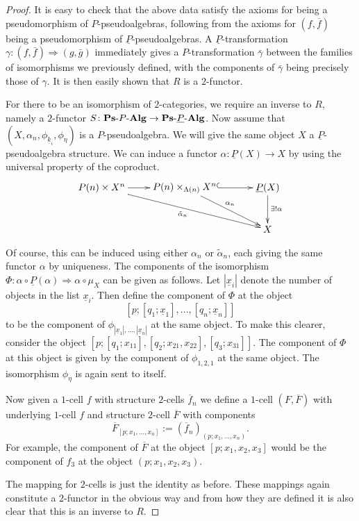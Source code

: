 \begin{proof}
It is easy to check that the above data satisfy the axioms for being a pseudomorphism of $P$-pseudoalgebras, following from the axioms for $(f,\overline{f})$ being a pseudomorphism of $\underline{P}$-pseudoalgebras. A $\underline{P}$-transformation $\gamma \colon (f, \bar{f}) \Rightarrow (g, \bar{g})$ immediately gives a $P$-transformation $\bar{\gamma}$ between the families of isomorphisms we previously defined, with the components of $\bar{\gamma}$ being precisely those of $\gamma$. It is then easily shown that $R$ is a $2$-functor.

For there to be an isomorphism of $2$-categories, we require an inverse to $R$, namely a $2$-functor $S \colon \mathbf{Ps}\mbox{-}P\mbox{-}\mathbf{Alg} \rightarrow \mathbf{Ps}\mbox{-}\underline{P}\mbox{-}\mathbf{Alg}$. Now assume that $(X, \alpha_n, \phi_{\underline{k}_i}, \phi_\eta)$ is a $P$-pseudoalgebra. We will give the same object $X$ a $\underline{P}$-pseudoalgebra structure. We can induce a functor $\alpha \colon \underline{P}(X) \rightarrow X$ by using the universal property of the coproduct.
    \[
        \xy
            (-30,0)*+{P(n) \times X^n}="-10";
            (0,0)*+{P(n) \times_{\Lambda(n)} X^n}="00";
            (30,0)*+{\underline{P}(X)}="10";
            (30,-15)*+{X}="11";
            {\ar "-10" ; "00"};
            {\ar^{\alpha_n} "00" ; "11"};
            {\ar@{^{(}->} "00" ; "10"};
            {\ar^{\exists ! \alpha} "10" ; "11"};
            {\ar_{\tilde{\alpha}_n} "-10" ; "11"};
        \endxy
    \]

Of course, this can be induced using either $\alpha_n$ or $\tilde{\alpha}_n$, each giving the same functor $\alpha$ by uniqueness. The components of the isomorphism $\Phi \colon \alpha \circ \underline{P}(\alpha) \Rightarrow \alpha \circ \mu_X$ can be given as follows. Let $\left|\underline{x}_i\right|$ denote the number of objects in the list $\underline{x}_i$. Then define the component of $\Phi$ at the object
    \[
        \left[p;\left[q_1;\underline{x}_1\right],\ldots,\left[q_n;\underline{x}_n\right]\right]
    \]
to be the component of $\phi_{\left|\underline{x}_1\right|, \ldots, |\underline{x}_n|}$ at the same object. To make this clearer, consider the object $[p;[q_1;x_{11}],[q_2;x_{21},x_{22}],[q_3;x_{31}]]$. The component of $\Phi$ at this object is given by the component of $\phi_{1,2,1}$ at the same object. The isomorphism $\phi_\eta$ is again sent to itself.

Now given a $1$-cell $f$ with structure $2$-cells $\overline{f}_n$ we define a $1$-cell $(F,\overline{F})$ with underlying $1$-cell $f$ and structure $2$-cell $\overline{F}$ with components
    \[
        \overline{F}_{[p;x_1, \ldots, x_n]} := \left(\overline{f}_{n}\right)_{(p;x_1,\ldots,x_n)}.
    \]
For example, the component of $\overline{F}$ at the object $[p;x_1,x_2,x_3]$ would be the component of $f_3$ at the object $(p;x_1,x_2,x_3)$.

The mapping for $2$-cells is just the identity as before. These mappings again constitute a $2$-functor in the obvious way and from how they are defined it is also clear that this is an inverse to $R$.
\end{proof}

